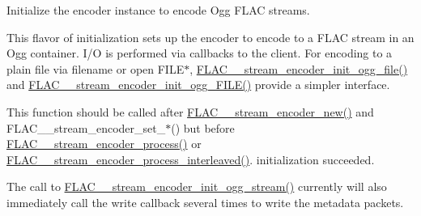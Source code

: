 Initialize the encoder instance to encode Ogg F\+L\+AC streams.

This flavor of initialization sets up the encoder to encode to a F\+L\+AC stream in an Ogg container. I/O is performed via callbacks to the client. For encoding to a plain file via filename or open {\ttfamily F\+I\+L\+E$\ast$}, \hyperlink{group__flac__stream__encoder_ga51eb79f04e9a676cd1ce0c94729252e4}{F\+L\+A\+C\+\_\+\+\_\+stream\+\_\+encoder\+\_\+init\+\_\+ogg\+\_\+file()} and \hyperlink{group__flac__stream__encoder_gab44c7f51a61826e04abd8cdf5c1ceac2}{F\+L\+A\+C\+\_\+\+\_\+stream\+\_\+encoder\+\_\+init\+\_\+ogg\+\_\+\+F\+I\+L\+E()} provide a simpler interface.

This function should be called after \hyperlink{group__flac__stream__encoder_ga35f3d94452bcf0a90a31c7d770b200bc}{F\+L\+A\+C\+\_\+\+\_\+stream\+\_\+encoder\+\_\+new()} and F\+L\+A\+C\+\_\+\+\_\+stream\+\_\+encoder\+\_\+set\+\_\+$\ast$() but before \hyperlink{group__flac__stream__encoder_gae187ec4f6cab3ca109637996ee23272d}{F\+L\+A\+C\+\_\+\+\_\+stream\+\_\+encoder\+\_\+process()} or \hyperlink{group__flac__stream__encoder_ga67c2ff5b23b945180797de420b1f27c0}{F\+L\+A\+C\+\_\+\+\_\+stream\+\_\+encoder\+\_\+process\+\_\+interleaved()}. initialization succeeded.

The call to \hyperlink{group__flac__stream__encoder_ga87af71d74c09f7d482f9f420ef9bf826}{F\+L\+A\+C\+\_\+\+\_\+stream\+\_\+encoder\+\_\+init\+\_\+ogg\+\_\+stream()} currently will also immediately call the write callback several times to write the metadata packets.


